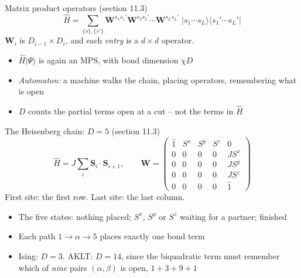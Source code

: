 \documentclass[aspectratio=169,10pt]{beamer}
\newcommand{\ket}[1]{\vert #1\rangle}
\newcommand{\bra}[1]{\langle #1\vert}
\newcommand{\bmat}[1]{\bm{#1}}
\newcommand{\hH}{\hat{H}}
\begin{document}
\begin{frame}{Matrix product operators (section 11.3)}
  \[
    \hH=\sum_{\{s\},\{s'\}}\bmat W^{s_1s_1'}\bmat W^{s_2s_2'}\cdots\bmat W^{s_Ls_L'}\;\ket{s_1\cdots s_L}\bra{s_1'\cdots s_L'}
  \]
  $\bmat W_i$ is $D_{i-1}\times D_i$, and each \emph{entry} is a $d\times d$ operator.
  \begin{center}
  \end{center}
  \begin{itemize}
    \item $\hH\ket\Psi$ is again an MPS, with bond dimension $\chi D$
    \item \emph{Automaton:} a machine walks the chain, placing operators, remembering what is open
    \item \alert{$D$ counts the partial terms open at a cut} -- not the terms in $\hH$
  \end{itemize}
\end{frame}

\begin{frame}{The Heisenberg chain: $D=5$ (section 11.3)}
  \[
    \hH=J\sum_i\bm S_i\cdot\bm S_{i+1},
    \qquad
    \bmat W=\begin{pmatrix}
      \hat1 & S^x & S^y & S^z & 0\\
      0&0&0&0&JS^x\\
      0&0&0&0&JS^y\\
      0&0&0&0&JS^z\\
      0&0&0&0&\hat1
    \end{pmatrix}
  \]
  \centering First site: the first row. Last site: the last column.
  \begin{itemize}
    \item The five states: nothing placed; $S^x$, $S^y$ or $S^z$ waiting for a partner; finished
    \item Each path $1\to\alpha\to5$ places exactly one bond term
    \item Ising: $D=3$. AKLT: $D=14$, since the biquadratic term must remember which of \emph{nine} pairs $(\alpha,\beta)$ is open, $1+3+9+1$
  \end{itemize}
\end{frame}
\end{document}
